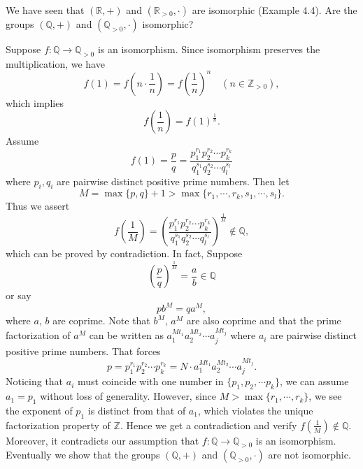 \documentclass[12pt,letterpaper,boxed]{hmcpset}
\begin{document}
\begin{problem}[4.6]
	We have seen that $(\mathbb{R}, +)$ and $(\mathbb{R}_{>0},\cdot)$ are isomorphic (Example 4.4). Are the groups $(\mathbb{Q}, +)$ and $(\mathbb{Q}_{>0},\cdot)$ isomorphic?
\end{problem}
\begin{solution}
	Suppose $f:\mathbb{Q}\rightarrow\mathbb{Q}_{>0}$ is an isomorphism. 
	Since isomorphism preserves the multiplication, we have
	\[
	f(1)=f\left(n\cdot\frac{1}{n}\right)=f\left(\frac{1}{n}\right)^n\quad(n\in\mathbb{Z}_{>0}),
	\]
	which implies
	\[
	f\left(\frac{1}{n}\right)=f(1)^{\frac{1}{n}}.
	\] 
	Assume 
	$$f(1)=\dfrac{p}{q}=\dfrac{p_1^{r_1}p_2^{r_2}\cdots p_k^{r_k}}{q_1^{s_1}q_2^{s_2}\cdots q_l^{s_l}}$$
	where $p_i,q_i$ are pairwise distinct positive prime numbers. Then let $$M=\max\{p,q\}+1>\max\{r_1,\cdots,r_k,s_1,\cdots,s_l\}.$$
	Thus we assert
	\[
	f\left(\frac{1}{M}\right)=\left(\dfrac{p_1^{r_1}p_2^{r_2}\cdots p_k^{r_k}}{q_1^{s_1}q_2^{s_2}\cdots q_l^{s_l}}\right)^{\frac{1}{M}}\notin\mathbb{Q},
	\]
	which can be proved by contradiction. In fact, Suppose 
	\[
	\left(\dfrac{p}{q}\right)^{\tfrac{1}{M}}=\dfrac{a}{b}\in\mathbb{Q}
	\] 
	or say
	\[
	pb^M=qa^M,
	\]
	where $a$, $b$ are coprime. Note that $b^M$, $a^M$ are also coprime and that the prime factorization of $a^M$ can be written as $a_1^{Mt_1}a_2^{Mt_2}\cdots a_j^{Mt_j}$ where $a_i$ are pairwise distinct positive prime numbers. That forces 
	\[
	p=p_1^{r_1}p_2^{r_2}\cdots p_k^{r_k}=N\cdot a_1^{Mt_1}a_2^{Mt_2}\cdots a_j^{Mt_j}.
	\]
	Noticing that $a_i$ must coincide with one number in $\{p_1,p_2,\cdots p_k\}$, we can assume $a_1=p_1$ without loss of generality. However, since $M>\max\{r_1,\cdots,r_k\}$, we see the exponent of $p_1$ is distinct from that of $a_1$, which violates the unique factorization property of $\mathbb{Z}$. Hence we get a contradiction and verify $	f\left(\frac{1}{M}\right)\notin \mathbb{Q}$. Moreover, it contradicts our assumption that $f:\mathbb{Q}\rightarrow\mathbb{Q}_{>0}$ is an isomorphism. Eventually we show that the groups $(\mathbb{Q}, +)$ and $(\mathbb{Q}_{>0},\cdot)$ are not isomorphic. 

	

	
\end{solution}


   
\end{document}

